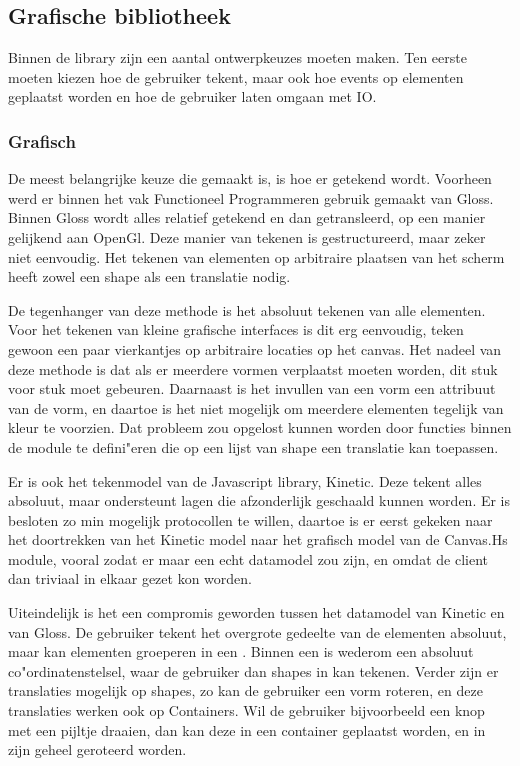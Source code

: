 \subsection{Grafische bibliotheek} \label{subsec:grafische_bibliotheek}

Binnen de library zijn een aantal ontwerpkeuzes moeten maken. Ten eerste moeten kiezen hoe de gebruiker tekent, maar ook hoe events op elementen geplaatst worden en hoe de gebruiker laten omgaan met IO.

\subsubsection{Grafisch}
De meest belangrijke keuze die gemaakt is, is hoe er getekend wordt. Voorheen werd er binnen het vak Functioneel Programmeren gebruik gemaakt van Gloss. Binnen Gloss wordt alles relatief getekend en dan getransleerd, op een manier gelijkend aan OpenGl. Deze manier van tekenen is gestructureerd, maar zeker niet eenvoudig. Het tekenen van elementen op arbitraire plaatsen van het scherm heeft zowel een shape als een translatie nodig.

De tegenhanger van deze methode is het absoluut tekenen van alle elementen. Voor het tekenen van kleine grafische interfaces is dit erg eenvoudig, teken gewoon een paar vierkantjes op arbitraire locaties op het canvas. Het nadeel van deze methode is dat als er meerdere vormen verplaatst moeten worden, dit stuk voor stuk moet gebeuren. Daarnaast is het invullen van een vorm een attribuut van de vorm, en daartoe is het niet mogelijk om meerdere elementen tegelijk van kleur te voorzien. Dat probleem zou opgelost kunnen worden door functies binnen de module te defini"eren die op een lijst van shape een translatie kan toepassen.

Er is ook het tekenmodel van de Javascript library, Kinetic. Deze tekent alles absoluut, maar ondersteunt lagen die afzonderlijk geschaald kunnen worden. Er is besloten zo min mogelijk protocollen te willen, daartoe is er eerst gekeken naar het doortrekken van het Kinetic model naar het grafisch model van de Canvas.Hs module, vooral zodat er maar een echt datamodel zou zijn, en omdat de client dan triviaal in elkaar gezet kon worden.

Uiteindelijk is het een compromis geworden tussen het datamodel van Kinetic en van Gloss. De gebruiker tekent het overgrote gedeelte van de elementen absoluut, maar kan elementen groeperen in een . Binnen een  is wederom een absoluut co"ordinatenstelsel, waar de gebruiker dan shapes in kan tekenen. Verder zijn er translaties mogelijk op shapes, zo kan de gebruiker een vorm roteren, en deze translaties werken ook op Containers. Wil de gebruiker bijvoorbeeld een knop met een pijltje draaien, dan kan deze in een container geplaatst worden, en in zijn geheel geroteerd worden.

